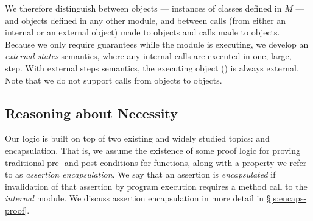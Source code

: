 We therefore distinguish between \emph{\internalO}
objects --- instances of classes defined in $M$ ---
and \emph{\externalO} objects defined in any other module, and
between \emph{\internalC} calls  (from either an internal or an external object)  made %
 to \internalO objects and \emph{\externalC} calls made %
 to \externalC objects. %
%
%
Because we only require guarantees while 
the  \externalM module  is executing,
we develop an \emph{external states} semantics, where
 any internal calls are executed in one, large, step.
With external steps semantics,  the executing object () is always   external. 
Note that we do not support calls from
\internalO objects to \externalO objects.

%

\newcommand{\vertsp} {\vspace{.05in}} 
 
\subsection{Reasoning about Necessity}
\label{s:approach}

Our logic  
 is built on top of   
 two existing and widely studied topics:
 \funcSpecs and encapsulation. That is, we assume the existence of
 some proof logic for proving traditional pre- and post-conditions for functions, 
 along with a property we refer to as \emph{assertion encapsulation}.
 We say that an assertion is \emph{encapsulated} if  invalidation 
 of that assertion by program execution requires a method call to the 
 \emph{internal} module. We discuss assertion encapsulation in more detail in \S \ref{s:encaps-proof}.
 
